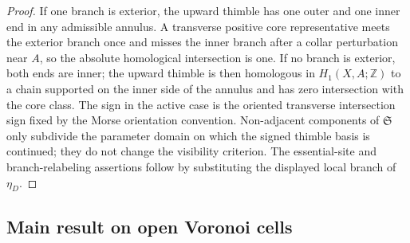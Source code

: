 \documentclass[reqno]{article}
\theoremstyle{definition}
\theoremstyle{remark}
\theoremstyle{plain}
\begin{document}
\begin{proof}
If one branch is exterior, the upward thimble has one outer and one inner end in any admissible annulus. A transverse positive core representative meets the exterior branch once and misses the inner branch after a collar perturbation near $A$, so the absolute homological intersection is one. If no branch is exterior, both ends are inner; the upward thimble is then homologous in $H_1(X,A;\mathbb Z)$ to a chain supported on the inner side of the annulus and has zero intersection with the core class. The sign in the active case is the oriented transverse intersection sign fixed by the Morse orientation convention. Non-adjacent components of $\mathfrak S$ only subdivide the parameter domain on which the signed thimble basis is continued; they do not change the visibility criterion. The essential-site and branch-relabeling assertions follow by substituting the displayed local branch of $\eta_D$.
\end{proof}

\subsection{Main result on open Voronoi cells}
\end{document}
